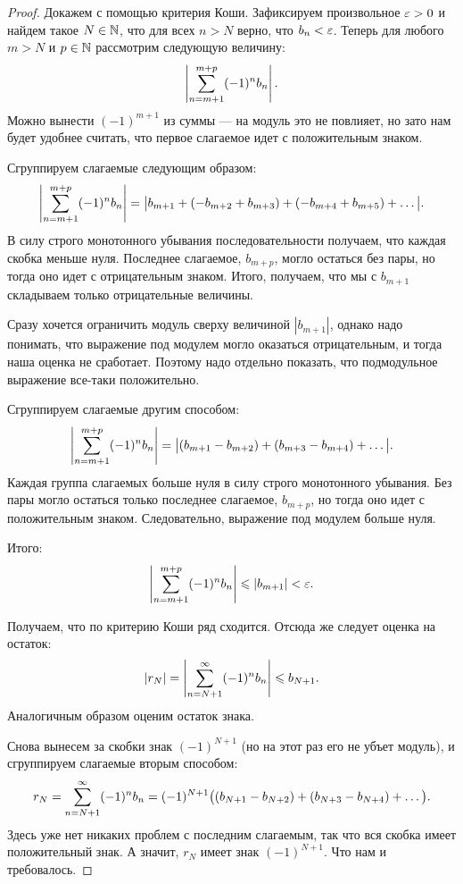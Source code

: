\documentclass[a4paper, 12pt]{article}
\begin{document}
\begin{proof}
Докажем с помощью критерия Коши. Зафиксируем произвольное $\varepsilon > 0$ и найдем такое $N \in \mathbb{N}$, что для всех $n > N$ верно, что $b_n < \varepsilon$. Теперь для любого $m > N$ и $p \in \mathbb{N}$ рассмотрим следующую величину:
$$
\left| \sum\limits_{n=m+1}^{m+p} (-1)^n b_n \right|.
$$  
Можно вынести $(-1)^{m+1}$ из суммы --- на модуль это не повлияет, но зато нам будет удобнее считать, что первое слагаемое идет с положительным знаком.

Сгруппируем слагаемые следующим образом:
$$
\left| \sum\limits_{n=m+1}^{m+p} (-1)^n b_n \right| = \big|b_{m+1} + (- b_{m+2} + b_{m+3}) + (- b_{m+4} + b_{m+5}) + \ldots\big|.
$$
В силу строго монотонного убывания последовательности получаем, что каждая скобка меньше нуля. Последнее слагаемое, $b_{m+p}$, могло остаться без пары, но тогда оно идет с отрицательным знаком. Итого, получаем, что мы с $b_{m+1}$ складываем только отрицательные величины. 

Сразу хочется ограничить модуль сверху величиной $|b_{m+1}|$, однако надо понимать, что выражение под модулем могло оказаться отрицательным, и тогда наша оценка не сработает. Поэтому надо отдельно показать, что подмодульное выражение все-таки положительно.

Сгруппируем слагаемые другим способом:
$$
\left| \sum\limits_{n=m+1}^{m+p} (-1)^n b_n \right| = \big|(b_{m+1} - b_{m+2}) + (b_{m+3} - b_{m+4}) + \ldots\big|.
$$
Каждая группа слагаемых больше нуля в силу строго монотонного убывания. Без пары могло остаться только последнее слагаемое, $b_{m+p}$, но тогда оно идет с положительным знаком. Следовательно, выражение под модулем больше нуля.

Итого:
$$
\left| \sum\limits_{n=m+1}^{m+p} (-1)^n b_n \right| \leqslant |b_{m+1}| < \varepsilon.
$$

Получаем, что по критерию Коши ряд сходится. Отсюда же следует оценка на остаток: 
$$
|r_N| = \left| \sum\limits_{n=N+1}^{\infty}(-1)^n b_n  \right| \leqslant b_{N+1}.
$$
Аналогичным образом оценим остаток знака.

Снова вынесем за скобки знак $(-1)^{N+1}$ (но на этот раз его не убъет модуль), и сгруппируем слагаемые вторым способом:
$$
r_N = \sum\limits_{n=N+1}^{\infty} (-1)^n b_n  = (-1)^{N+1}\big((b_{N+1} - b_{N+2}) + (b_{N+3} - b_{N+4}) + \ldots\big).$$
Здесь уже нет никаких проблем с последним слагаемым, так что вся скобка имеет положительный знак. А значит, $r_N$ имеет знак $(-1)^{N+1}$. Что нам и требовалось.
\end{proof}
\end{document}
